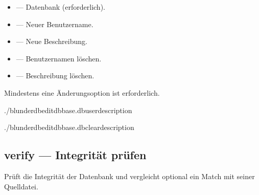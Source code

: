 \documentclass[letterpaper,10pt,german]{sphinxmanual}
\begin{document}
\sphinxAtStartPar
{}
\begin{itemize}
\item {} 
\sphinxAtStartPar
{} — Datenbank (erforderlich).

\item {} 
\sphinxAtStartPar
{} — Neuer Benutzername.

\item {} 
\sphinxAtStartPar
{} — Neue Beschreibung.

\item {} 
\sphinxAtStartPar
{} — Benutzernamen löschen.

\item {} 
\sphinxAtStartPar
{} — Beschreibung löschen.

\end{itemize}

\sphinxAtStartPar
Mindestens eine Änderungsoption ist erforderlich.

\sphinxAtStartPar
{}

\begin{sphinxVerbatim}[commandchars=\\\{\}]
./blunderdbedit\PYGZhy{}\PYGZhy{}dbbase.db\PYGZhy{}\PYGZhy{}user\PYGZhy{}\PYGZhy{}description

./blunderdbedit\PYGZhy{}\PYGZhy{}dbbase.db\PYGZhy{}\PYGZhy{}clear\PYGZhy{}description
\end{sphinxVerbatim}


\subsection{verify — Integrität prüfen}
\label{\detokenize{cli:verify-verifier-l-integrite}}
\sphinxAtStartPar
Prüft die Integrität der Datenbank und vergleicht optional ein Match mit seiner Quelldatei.
\end{document}
